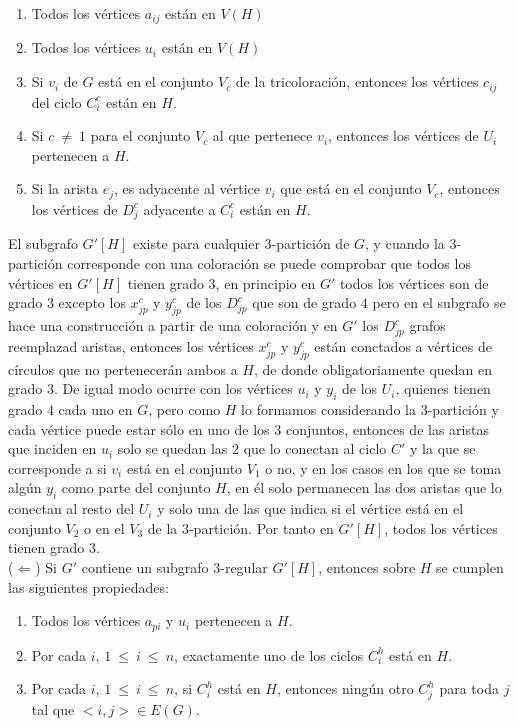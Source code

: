 \documentclass{article}
\begin{document}
\begin{enumerate}
    \item Todos los v\'ertices $a_{ij}$ est\'an en $V(H)$
    \item Todos los v\'ertices $u_{i}$ est\'an en $V(H)$
    \item Si $v_i$ de $G$ est\'a en el conjunto $V_c$ de la tricoloraci\'on, entonces los v\'ertices $c_{ij}$ del ciclo $C_i^c$ est\'an en $H$.
    \item Si $c ~\neq ~1$ para el conjunto $V_c$ al que pertenece $v_i$, entonces los v\'ertices de $U_i$ pertenecen a $H$.
    \item Si la arista $e_j$, es adyacente al v\'ertice $v_i$ que est\'a en el conjunto $V_c$, entonces los v\'ertices de $D_j^c$ adyacente a $C_i^c$ est\'an en $H$.
\end{enumerate}
    El subgrafo $G'[H]$ existe para cualquier $3$-partici\'on de $G$, y cuando la $3$-partici\'on corresponde con una 
    coloraci\'on se puede comprobar que todos los v\'ertices en $G'[H]$ tienen grado $3$, en principio en $G'$ todos los v\'ertices son de grado $3$ excepto los 
    $x_{jp}^c$ y $y_{jp}^c$ de los $D_{jp}^c$ que son de grado $4$ pero en el subgrafo se hace una construcci\'on a partir de una coloraci\'on y en $G'$ los $D_{jp}^c$ grafos reemplazad aristas, 
    entonces los v\'ertices $x_{jp}^c$ y $y_{jp}^c$ est\'an conctados a v\'ertices de c\'irculos que no pertenecer\'an ambos a $H$, de donde obligatoriamente quedan en grado $3$. De igual modo ocurre con los v\'ertices $u_i$ y $y_i$ de los $U_i$, quienes tienen 
    grado $4$ cada uno en $G$, pero como $H$ lo formamos considerando la $3$-partici\'on y cada v\'ertice puede estar s\'olo en uno de los $3$ conjuntos, entonces de las aristas que inciden en $u_i$ solo se quedan las $2$ que lo conectan al ciclo $C'$ y la que se corresponde a si $v_i$ 
    est\'a en el conjunto $V_1$ o no, y en los casos en los que se toma alg\'un $y_i$ como parte del conjunto $H$, en \'el solo permanecen las dos aristas que lo conectan al resto del $U_i$ y solo una de las que indica si el v\'ertice est\'a en el conjunto $V_2$ o en el $V_3$ de la $3$-partici\'on. 
    Por tanto en $G'[H]$, todos los v\'ertices tienen grado $3$.\\ 

($\Leftarrow$) Si $G'$ contiene un subgrafo $3$-regular $G'[H]$, entonces sobre $H$ se cumplen las siguientes propiedades:\\ 

\begin{enumerate}
    \item Todos los v\'ertices $a_{pi}$ y $u_i$ pertenecen a $H$.
    \item Por cada $i$, $1~ \leq~i~\leq ~n$, exactamente uno de los ciclos $C_i^{h}$ est\'a en $H$.
    \item Por cada $i$, $1~ \leq~i~\leq ~n$, si $C_i^{h}$ est\'a en $H$, entonces ning\'un otro $C_j^{h}$ para toda $j$ tal que $<i,j> \in E(G)$.
\end{enumerate}
\end{document}
